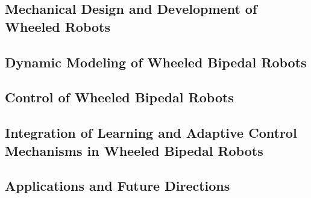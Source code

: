 \subsection{Mechanical Design and Development of Wheeled Robots}

\subsection{Dynamic Modeling of Wheeled Bipedal Robots}
\subsection{Control of Wheeled Bipedal Robots}
\subsection{Integration of Learning and Adaptive Control Mechanisms in Wheeled Bipedal Robots}
\subsection{Applications and Future Directions}


